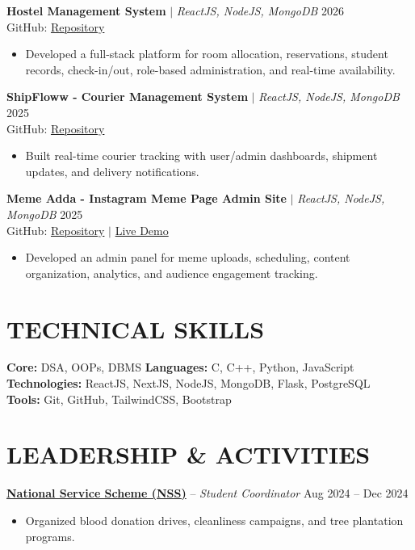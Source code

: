 \documentclass[a4paper,10pt]{article}
\begin{document}
\textbf{Hostel Management System} $|$ \textit{ReactJS, NodeJS, MongoDB} \hfill 2026\\
GitHub: \href{https://github.com/rathod-ramraj/hostel-management-system}{Repository}
\begin{itemize}
    \item Developed a full-stack platform for room allocation, reservations, student records, check-in/out, role-based administration, and real-time availability.
\end{itemize}

\textbf{ShipFloww - Courier Management System} $|$ \textit{ReactJS, NodeJS, MongoDB} \hfill 2025\\
GitHub: \href{https://github.com/rathod-ramraj/ShipFloww}{Repository}
\begin{itemize}
    \item Built real-time courier tracking with user/admin dashboards, shipment updates, and delivery notifications.
\end{itemize}

\textbf{Meme Adda - Instagram Meme Page Admin Site} $|$ \textit{ReactJS, NodeJS, MongoDB} \hfill 2025\\
GitHub: \href{https://github.com/rathod-ramraj/meme-adda1}{Repository} $\mid$ \href{https://memeadda098.vercel.app/}{Live Demo}
\begin{itemize}
    \item Developed an admin panel for meme uploads, scheduling, content organization, analytics, and audience engagement tracking.
\end{itemize}

\section*{TECHNICAL SKILLS}

\textbf{Core:} DSA, OOPs, DBMS \quad
\textbf{Languages:} C, C++, Python, JavaScript\\
\textbf{Technologies:} ReactJS, NextJS, NodeJS, MongoDB, Flask, PostgreSQL\\
\textbf{Tools:} Git, GitHub, TailwindCSS, Bootstrap

\section*{LEADERSHIP \& ACTIVITIES}

\textbf{\href{https://nss.gov.in/}{National Service Scheme (NSS)}} -- \textit{Student Coordinator} \hfill Aug 2024 -- Dec 2024
\begin{itemize}
    \item Organized blood donation drives, cleanliness campaigns, and tree plantation programs.
\end{itemize}
\end{document}
